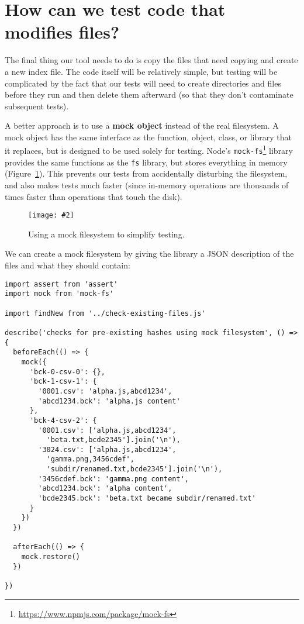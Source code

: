 \documentclass[krantzl]{krantz}
\newcommand{\figpdf}[4]{\begin{figure}%
\centering%
\texttt{[image: \#2]}%
\caption{#3}%
\label{#1}%
\end{figure}}
\newcommand{\figref}[1]{Figure~\ref{#1}}
\newcommand{\glossref}[1]{\textbf{#1}}
\newcommand{\hreffoot}[2]{{#1}\footnote{\href{#2}{#2}}}
\begin{document}
\section{How can we test code that modifies files?}\label{file-backup-test}


The final thing our tool needs to do
is copy the files that need copying and create a new index file.
The code itself will be relatively simple,
but testing will be complicated by the fact
that our tests will need to create directories and files before they run
and then delete them afterward
(so that they don’t contaminate subsequent tests).


A better approach is to use a \glossref{mock object}
instead of the real filesystem.
A mock object has the same interface as the function, object, class, or library that it replaces,
but is designed to be used solely for testing.
Node’s \hreffoot{\texttt{mock-fs}}{https://www.npmjs.com/package/mock-fs} library provides the same functions as the \texttt{fs} library,
but stores everything in memory
(\figref{file-backup-mock-fs}).
This prevents our tests from accidentally disturbing the filesystem,
and also makes tests much faster
(since in-memory operations are thousands of times faster than operations that touch the disk).

\figpdf{file-backup-mock-fs}{./file-backup/mock-fs.pdf}{Using a mock filesystem to simplify testing.}{0.6}


We can create a mock filesystem by giving the library a JSON description of
the files and what they should contain:


\begin{lstlisting}[frame=tblr]
import assert from 'assert'
import mock from 'mock-fs'

import findNew from '../check-existing-files.js'

describe('checks for pre-existing hashes using mock filesystem', () => {
  beforeEach(() => {
    mock({
      'bck-0-csv-0': {},
      'bck-1-csv-1': {
        '0001.csv': 'alpha.js,abcd1234',
        'abcd1234.bck': 'alpha.js content'
      },
      'bck-4-csv-2': {
        '0001.csv': ['alpha.js,abcd1234',
          'beta.txt,bcde2345'].join('\n'),
        '3024.csv': ['alpha.js,abcd1234',
          'gamma.png,3456cdef',
          'subdir/renamed.txt,bcde2345'].join('\n'),
        '3456cdef.bck': 'gamma.png content',
        'abcd1234.bck': 'alpha content',
        'bcde2345.bck': 'beta.txt became subdir/renamed.txt'
      }
    })
  })

  afterEach(() => {
    mock.restore()
  })

})
\end{lstlisting}
\end{document}
